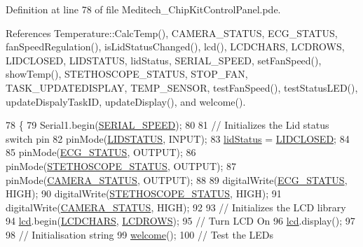 Definition at line 78 of file Meditech\-\_\-\-Chip\-Kit\-Control\-Panel.\-pde.



References Temperature\-::\-Calc\-Temp(), C\-A\-M\-E\-R\-A\-\_\-\-S\-T\-A\-T\-U\-S, E\-C\-G\-\_\-\-S\-T\-A\-T\-U\-S, fan\-Speed\-Regulation(), is\-Lid\-Status\-Changed(), lcd(), L\-C\-D\-C\-H\-A\-R\-S, L\-C\-D\-R\-O\-W\-S, L\-I\-D\-C\-L\-O\-S\-E\-D, L\-I\-D\-S\-T\-A\-T\-U\-S, lid\-Status, S\-E\-R\-I\-A\-L\-\_\-\-S\-P\-E\-E\-D, set\-Fan\-Speed(), show\-Temp(), S\-T\-E\-T\-H\-O\-S\-C\-O\-P\-E\-\_\-\-S\-T\-A\-T\-U\-S, S\-T\-O\-P\-\_\-\-F\-A\-N, T\-A\-S\-K\-\_\-\-U\-P\-D\-A\-T\-E\-D\-I\-S\-P\-L\-A\-Y, T\-E\-M\-P\-\_\-\-S\-E\-N\-S\-O\-R, test\-Fan\-Speed(), test\-Status\-L\-E\-D(), update\-Dispaly\-Task\-I\-D, update\-Display(), and welcome().


\begin{DoxyCode}
78              \{
79   Serial1.begin(\hyperlink{_globals_8h_a4081bc1d938e0d9b2b0941e3a1143498}{SERIAL\_SPEED});
80 
81   \textcolor{comment}{// Initializes the Lid status switch pin}
82   pinMode(\hyperlink{_globals_8h_a9d1e04090b98f20c171c70e566a32e16}{LIDSTATUS}, INPUT);
83   \hyperlink{_meditech___chip_kit_control_panel_8pde_adea51712174a5f82a31231a67e0d4608}{lidStatus} = \hyperlink{_globals_8h_af04a3919dc1fa7d521c9514be995b43d}{LIDCLOSED};
84   
85   pinMode(\hyperlink{_globals_8h_a81c971d1ee27ca31e310c80ef260b390}{ECG\_STATUS}, OUTPUT);
86   pinMode(\hyperlink{_globals_8h_a8519a074bf27b6dcc876ce549b2f5ea7}{STETHOSCOPE\_STATUS}, OUTPUT);
87   pinMode(\hyperlink{_globals_8h_ad0154ccab9906702a495f07dfedd0136}{CAMERA\_STATUS}, OUTPUT);
88 
89   digitalWrite(\hyperlink{_globals_8h_a81c971d1ee27ca31e310c80ef260b390}{ECG\_STATUS}, HIGH);
90   digitalWrite(\hyperlink{_globals_8h_a8519a074bf27b6dcc876ce549b2f5ea7}{STETHOSCOPE\_STATUS}, HIGH);
91   digitalWrite(\hyperlink{_globals_8h_ad0154ccab9906702a495f07dfedd0136}{CAMERA\_STATUS}, HIGH);
92 
93   \textcolor{comment}{// Initializes the LCD library}
94   \hyperlink{_meditech___chip_kit_control_panel_8pde_ae0b100905fb0ed88dddaafda0aa05379}{lcd}.begin(\hyperlink{_l_c_d_8h_acea744bc7db589514d98dde1a19a4be6}{LCDCHARS}, \hyperlink{_l_c_d_8h_a1b8861bc5ab0412d754e0bd902c73bcf}{LCDROWS});
95   \textcolor{comment}{// Turn LCD On}
96   \hyperlink{_meditech___chip_kit_control_panel_8pde_ae0b100905fb0ed88dddaafda0aa05379}{lcd}.display();
97 
98   \textcolor{comment}{// Initialisation string}
99   \hyperlink{_meditech___chip_kit_control_panel_8pde_a236e454e493fc9b262f746305660a2eb}{welcome}();
100   \textcolor{comment}{// Test the LEDs}

\end{DoxyCode}
